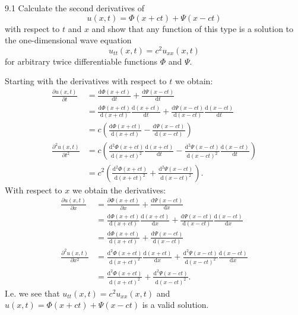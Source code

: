 
\begin{problem}{9.1}
  Calculate the second derivatives of
  \[ 
  u(x,t) = \Phi(x + ct) + \Psi(x-ct)
  \]
  with respect to $t$ and $x$ and show that any function of this type is a solution to the one-dimensional wave equation
  \[ 
  u_{t t}(x,t) = c^2 u_{x x}(x,t)
  \]
  for arbitrary twice differentiable functions $\Phi$ and $\Psi$.
\end{problem}

\begin{derivation}
  Starting with the derivatives with respect to $t$ we obtain:
  \begin{align*}
    \frac{\partial u(x,t)}{\partial t} &= \frac{\mathrm{d}\Phi(x+ct)}{\mathrm{d}t} + \frac{\mathrm{d}\Psi(x-ct)}{\mathrm{d}t}  \\
          &= \frac{\mathrm{d}\Phi(x+ct)}{\mathrm{d}(x+ct)} \frac{\mathrm{d}(x+ct)}{\mathrm{d}t} + \frac{\mathrm{d}\Psi(x-ct)}{\mathrm{d}(x-ct)} \frac{\mathrm{d}(x-ct)}{\mathrm{d}t}    \\
          &= c \left( \frac{\mathrm{d}\Phi(x+ct)}{\mathrm{d}(x+ct)} - \frac{\mathrm{d}\Psi(x-ct)}{\mathrm{d}(x-ct)}   \right) \\
          \frac{\partial ^2 u(x,t)}{\partial t^2} &= c \left( \frac{\mathrm{d}^2\Phi(x+ct)}{\mathrm{d}(x+ct)^2} \frac{\mathrm{d}(x+ct)}{\mathrm{d}t} - \frac{\mathrm{d}^2\Psi(x-ct)}{\mathrm{d}(x-ct)^2} \frac{\mathrm{d}(x-ct)}{\mathrm{d}t}   \right) \\
          &= c^2 \left( \frac{\mathrm{d}^2 \Phi(x+ct)}{\mathrm{d}(x+ct)^2} + \frac{\mathrm{d}^2 \Psi(x-ct)}{\mathrm{d}(x-ct)^2}   \right)
  .\end{align*}
  With respect to $x$ we obtain the derivatives:
  \begin{align*}
    \frac{\partial u(x,t)}{\partial x} &= \frac{\partial \Phi(x+ct)}{\partial x} + \frac{\mathrm{d}\Psi(x-ct)}{\mathrm{d}x}  \\
    &= \frac{\mathrm{d}\Phi(x+ct)}{\mathrm{d}(x+ct)} \frac{\mathrm{d}(x+ct)}{\mathrm{d}x} + \frac{\mathrm{d}\Psi(x-ct)}{\mathrm{d}(x-ct)} \frac{\mathrm{d}(x-ct)}{\mathrm{d}x}    \\
    &= \frac{\mathrm{d}\Phi(x+ct)}{\mathrm{d}(x+ct)} + \frac{\mathrm{d}\Psi(x-ct)}{\mathrm{d}(x-ct)}   \\
    \frac{\partial^2 u(x,t) }{\partial x^2} &= \frac{\mathrm{d}^2 \Phi(x+ct)}{\mathrm{d}(x+ct)^2} \frac{\mathrm{d}(x+ct)}{\mathrm{d}x} + \frac{\mathrm{d}^2 \Psi(x-ct)}{\mathrm{d}(x-ct)^2} \frac{\mathrm{d}(x-ct)}{\mathrm{d}x}  \\
    &= \frac{\mathrm{d}^2 \Phi(x+ct)}{\mathrm{d}(x+ct)^2} + \frac{\mathrm{d}^2 \Psi(x-ct)}{\mathrm{d}(x-ct)^2}  
  .\end{align*}
  I.e. we see that $u_{t t}(x,t) = c^2 u_{x x}(x,t)$ and $u(x,t) = \Phi(x+ct) + \Psi(x-ct)$ is a valid solution.
\end{derivation}

